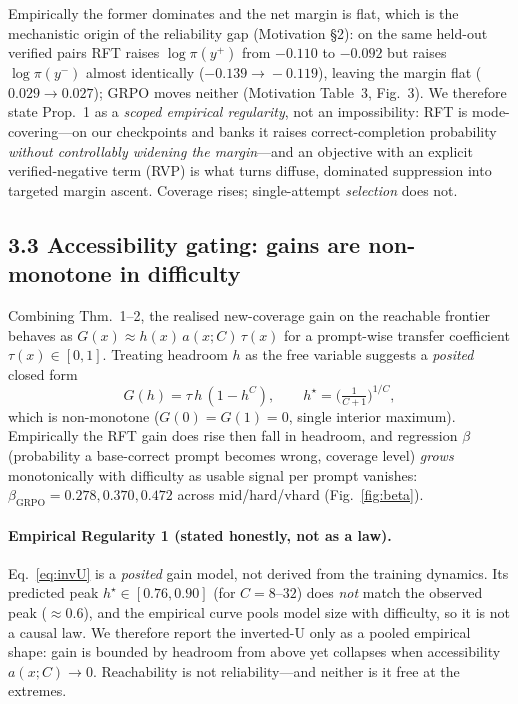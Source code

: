 Empirically the former dominates and the net margin is flat, which is the
mechanistic origin of the reliability gap (Motivation \S2): on the same held-out
verified pairs RFT raises $\log\pi(y^{+})$ from $-0.110$ to $-0.092$ but raises
$\log\pi(y^{-})$ almost identically ($-0.139\!\to\!-0.119$), leaving the margin flat
($0.029\!\to\!0.027$); GRPO moves neither (Motivation Table~3, Fig.~3). We therefore
state Prop.~1 as a \emph{scoped empirical regularity}, not an impossibility: RFT is
mode-covering---on our checkpoints and banks it raises correct-completion
probability \emph{without controllably widening the margin}---and an objective with
an explicit verified-negative term (RVP) is what turns diffuse, dominated
suppression into targeted margin ascent. Coverage rises; single-attempt
\emph{selection} does not.

\subsection*{3.3 Accessibility gating: gains are non-monotone in difficulty}

Combining Thm.~1--2, the realised new-coverage gain on the reachable frontier
behaves as $G(x)\approx h(x)\,a(x;C)\,\tau(x)$ for a prompt-wise transfer
coefficient $\tau(x)\in[0,1]$. Treating headroom $h$ as the free variable suggests
a \emph{posited} closed form
\begin{equation}
G(h)=\tau\,h\,(1-h^{C}),\qquad
h^{\star}=\Big(\tfrac{1}{C+1}\Big)^{1/C},
\label{eq:invU}
\end{equation}
which is non-monotone ($G(0)=G(1)=0$, single interior maximum). Empirically the
RFT gain does rise then fall in headroom, and regression $\beta$ (probability a
base-correct prompt becomes wrong, coverage level) \emph{grows} monotonically with
difficulty as usable signal per prompt vanishes: $\beta_{\text{GRPO}}=0.278,0.370,
0.472$ across mid/hard/vhard (Fig.~\ref{fig:beta}).

\paragraph{Empirical Regularity 1 (stated honestly, not as a law).}
Eq.~\eqref{eq:invU} is a \emph{posited} gain model, not derived from the training
dynamics. Its predicted peak $h^{\star}\!\in\![0.76,0.90]$ (for $C{=}8\text{--}32$)
does \emph{not} match the observed peak ($\approx\!0.6$), and the empirical curve
pools model size with difficulty, so it is not a causal law. We therefore report
the inverted-U only as a pooled empirical shape: gain is bounded by headroom from
above yet collapses when accessibility $a(x;C)\!\to\!0$. Reachability is not
reliability---and neither is it free at the extremes.

